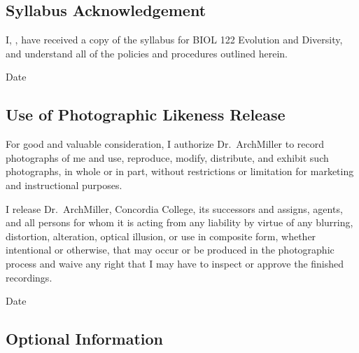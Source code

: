 \documentclass{tufte-handout}
\begin{document}
\newpage

\subsection{Syllabus Acknowledgement}

I, \underline{\hspace{5cm}}, have received a copy of the syllabus for BIOL 122 Evolution and Diversity, and understand all of the policies and procedures outlined herein. 

  \underline{\hspace{5cm}} {Date}  \hrulefill


\subsection{Use of Photographic Likeness Release}

For good and valuable consideration, I authorize Dr.~ArchMiller to record photographs of me and use, reproduce, modify, distribute, and exhibit such photographs, in whole or in part, without restrictions or limitation for marketing and instructional purposes. 

I release Dr.~ArchMiller, Concordia College, its successors and assigns, agents, and all persons for whom it is acting from any liability by virtue of any blurring, distortion, alteration, optical illusion, or use in composite form, whether intentional or otherwise, that may occur or be produced in the photographic process and waive any right that I may have to inspect or approve the finished recordings.

  \hrulefill
{}  \underline{\hspace{5cm}} {Date}  \hrulefill

\subsection{Optional Information}

 \hrulefill

 \hrulefill

 \hrulefill

 \hrulefill


 \hrulefill

\hrulefill

\hrulefill

\hrulefill

\hrulefill

\hrulefill
\end{document}

